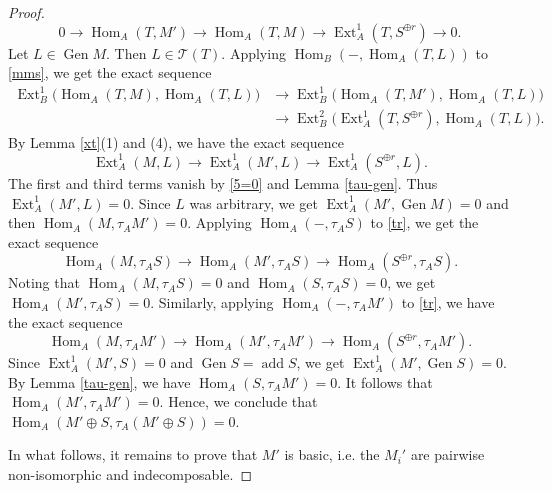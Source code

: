 \documentclass[reqno,12pt]{amsart}
\numberwithin{equation}{section}
\theoremstyle{plain}
\theoremstyle{definition}
\begin{document}
\begin{proof}
\begin{equation}\label{mms}
0 \longrightarrow \operatorname{Hom}_A(T,M') \longrightarrow \operatorname{Hom}_A(T,M) \longrightarrow {\operatorname{Ext}^1_A(T,S^{\oplus r})} \longrightarrow 0.
\end{equation}
Let $L\in\operatorname{Gen}M$. Then $L\in\mathcal T(T)$. Applying
$\operatorname{Hom}_B(-,\operatorname{Hom}_A(T,L))$ to \eqref{mms},
we get the exact sequence
\[
\begin{split}
\operatorname{Ext}_B^1\bigl(\operatorname{Hom}_A(T,M),
  \operatorname{Hom}_A(T,L)\bigr)
&\longrightarrow
\operatorname{Ext}_B^1\bigl(\operatorname{Hom}_A(T,M'),
  \operatorname{Hom}_A(T,L)\bigr)\\
&\longrightarrow
\operatorname{Ext}_B^2\bigl(\operatorname{Ext}_A^1(T,S^{\oplus r}),
  \operatorname{Hom}_A(T,L)\bigr).
\end{split}
\]
By Lemma \ref{xt}(1) and (4), we have the exact sequence
\[
\operatorname{Ext}_A^1(M,L)
\longrightarrow
\operatorname{Ext}_A^1(M',L)
\longrightarrow
\operatorname{Ext}_A^1(S^{\oplus r},L).
\]
The first and third terms vanish by \eqref{5=0} and
Lemma \ref{tau-gen}. Thus
$\operatorname{Ext}_A^1(M',L)=0$. Since $L$ was arbitrary,
we get $\operatorname{Ext}_A^1(M',\operatorname{Gen}M)=0$ and then
$\operatorname{Hom}_A(M,\tau_AM')=0$.
Applying $\operatorname{Hom}_A(-,\tau_A S)$ to \eqref{tr}, we get the exact sequence
\begin{equation*}
\operatorname{Hom}_A(M,\tau_A S) \longrightarrow \operatorname{Hom}_A(M',\tau_A S) \longrightarrow \operatorname{Hom}_A(S^{\oplus r},\tau_A S).
\end{equation*}
Noting that $\operatorname{Hom}_A(M,\tau_AS)=0$ and
$\operatorname{Hom}_A(S,\tau_AS)=0$, we get $\operatorname{Hom}_A(M',\tau_AS)=0$.
Similarly, applying $\operatorname{Hom}_A(-,\tau_AM')$ to \eqref{tr}, we have the exact sequence
\[
\operatorname{Hom}_A(M,\tau_AM')
\longrightarrow
\operatorname{Hom}_A(M',\tau_AM')
\longrightarrow
\operatorname{Hom}_A(S^{\oplus r},\tau_AM').
\]
Since
$\operatorname{Ext}_A^1(M',S)=0$ and
$\operatorname{Gen}S=\operatorname{add}S$, we get
$\operatorname{Ext}_A^1(M',\operatorname{Gen}S)=0$. By Lemma \ref{tau-gen}, we have
$\operatorname{Hom}_A(S,\tau_AM')=0$. It follows that
$\operatorname{Hom}_A(M',\tau_AM')=0$. Hence, we conclude that
$\operatorname{Hom}_A(M'\oplus S,\tau_A(M'\oplus S))=0$.

In what follows, it remains to prove that $M'$ is basic, i.e. the $M_i'$ are
pairwise non-isomorphic and indecomposable.


\end{proof}
\end{document}
